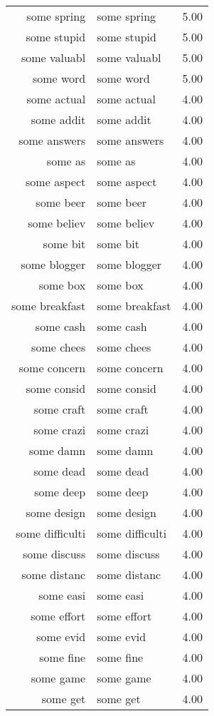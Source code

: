 \begin{table}[ht]
\begin{tabular}{rlr}
  some spring & some spring & 5.00 \\ 
  some stupid & some stupid & 5.00 \\ 
  some valuabl & some valuabl & 5.00 \\ 
  some word & some word & 5.00 \\ 
  some actual & some actual & 4.00 \\ 
  some addit & some addit & 4.00 \\ 
  some answers & some answers & 4.00 \\ 
  some as & some as & 4.00 \\ 
  some aspect & some aspect & 4.00 \\ 
  some beer & some beer & 4.00 \\ 
  some believ & some believ & 4.00 \\ 
  some bit & some bit & 4.00 \\ 
  some blogger & some blogger & 4.00 \\ 
  some box & some box & 4.00 \\ 
  some breakfast & some breakfast & 4.00 \\ 
  some cash & some cash & 4.00 \\ 
  some chees & some chees & 4.00 \\ 
  some concern & some concern & 4.00 \\ 
  some consid & some consid & 4.00 \\ 
  some craft & some craft & 4.00 \\ 
  some crazi & some crazi & 4.00 \\ 
  some damn & some damn & 4.00 \\ 
  some dead & some dead & 4.00 \\ 
  some deep & some deep & 4.00 \\ 
  some design & some design & 4.00 \\ 
  some difficulti & some difficulti & 4.00 \\ 
  some discuss & some discuss & 4.00 \\ 
  some distanc & some distanc & 4.00 \\ 
  some easi & some easi & 4.00 \\ 
  some effort & some effort & 4.00 \\ 
  some evid & some evid & 4.00 \\ 
  some fine & some fine & 4.00 \\ 
  some game & some game & 4.00 \\ 
  some get & some get & 4.00 \\ 

\end{tabular}
\end{table}
